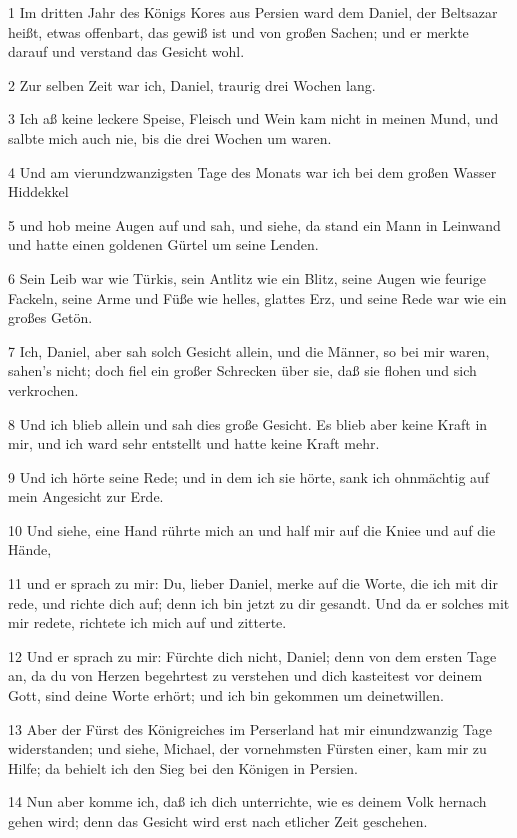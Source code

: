 \par 1 Im dritten Jahr des Königs Kores aus Persien ward dem Daniel, der Beltsazar heißt, etwas offenbart, das gewiß ist und von großen Sachen; und er merkte darauf und verstand das Gesicht wohl.
\par 2 Zur selben Zeit war ich, Daniel, traurig drei Wochen lang.
\par 3 Ich aß keine leckere Speise, Fleisch und Wein kam nicht in meinen Mund, und salbte mich auch nie, bis die drei Wochen um waren.
\par 4 Und am vierundzwanzigsten Tage des Monats war ich bei dem großen Wasser Hiddekkel
\par 5 und hob meine Augen auf und sah, und siehe, da stand ein Mann in Leinwand und hatte einen goldenen Gürtel um seine Lenden.
\par 6 Sein Leib war wie Türkis, sein Antlitz wie ein Blitz, seine Augen wie feurige Fackeln, seine Arme und Füße wie helles, glattes Erz, und seine Rede war wie ein großes Getön.
\par 7 Ich, Daniel, aber sah solch Gesicht allein, und die Männer, so bei mir waren, sahen's nicht; doch fiel ein großer Schrecken über sie, daß sie flohen und sich verkrochen.
\par 8 Und ich blieb allein und sah dies große Gesicht. Es blieb aber keine Kraft in mir, und ich ward sehr entstellt und hatte keine Kraft mehr.
\par 9 Und ich hörte seine Rede; und in dem ich sie hörte, sank ich ohnmächtig auf mein Angesicht zur Erde.
\par 10 Und siehe, eine Hand rührte mich an und half mir auf die Kniee und auf die Hände,
\par 11 und er sprach zu mir: Du, lieber Daniel, merke auf die Worte, die ich mit dir rede, und richte dich auf; denn ich bin jetzt zu dir gesandt. Und da er solches mit mir redete, richtete ich mich auf und zitterte.
\par 12 Und er sprach zu mir: Fürchte dich nicht, Daniel; denn von dem ersten Tage an, da du von Herzen begehrtest zu verstehen und dich kasteitest vor deinem Gott, sind deine Worte erhört; und ich bin gekommen um deinetwillen.
\par 13 Aber der Fürst des Königreiches im Perserland hat mir einundzwanzig Tage widerstanden; und siehe, Michael, der vornehmsten Fürsten einer, kam mir zu Hilfe; da behielt ich den Sieg bei den Königen in Persien.
\par 14 Nun aber komme ich, daß ich dich unterrichte, wie es deinem Volk hernach gehen wird; denn das Gesicht wird erst nach etlicher Zeit geschehen.
